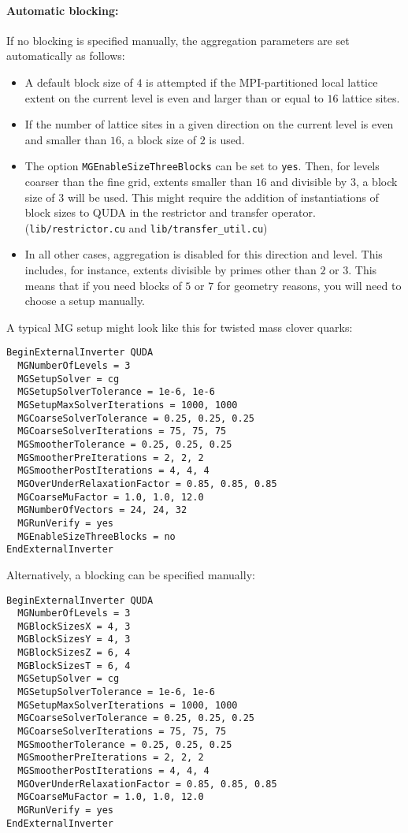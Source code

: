 \paragraph*{Automatic blocking:} If no blocking is specified manually, the aggregation parameters are set automatically as follows:
\begin{itemize}
  \item{ A default block size of $4$ is attempted if the MPI-partitioned local lattice extent on the current level is even and larger than or equal to $16$ lattice sites. }
  \item{ If the number of lattice sites in a given direction on the current level is even and smaller than $16$, a block size of $2$ is used. }
  \item{ The option \texttt{MGEnableSizeThreeBlocks} can be set to \texttt{yes}. Then, for levels coarser than the fine grid, extents smaller than $16$ and divisible by $3$, a block size of $3$ will be used. This might require the addition of instantiations of block sizes to QUDA in the restrictor and transfer operator. (\texttt{lib/restrictor.cu} and \texttt{lib/transfer\_util.cu}) }
  \item{ In all other cases, aggregation is disabled for this direction and level. This includes, for instance, extents divisible by primes other than $2$ or $3$. This means that if you need blocks of $5$ or $7$ for geometry reasons, you will need to choose a setup manually.}
\end{itemize}

A typical MG setup might look like this for twisted mass clover quarks: 

\begin{verbatim}
BeginExternalInverter QUDA
  MGNumberOfLevels = 3
  MGSetupSolver = cg
  MGSetupSolverTolerance = 1e-6, 1e-6
  MGSetupMaxSolverIterations = 1000, 1000
  MGCoarseSolverTolerance = 0.25, 0.25, 0.25
  MGCoarseSolverIterations = 75, 75, 75
  MGSmootherTolerance = 0.25, 0.25, 0.25
  MGSmootherPreIterations = 2, 2, 2
  MGSmootherPostIterations = 4, 4, 4
  MGOverUnderRelaxationFactor = 0.85, 0.85, 0.85
  MGCoarseMuFactor = 1.0, 1.0, 12.0
  MGNumberOfVectors = 24, 24, 32
  MGRunVerify = yes
  MGEnableSizeThreeBlocks = no
EndExternalInverter
\end{verbatim}

Alternatively, a blocking can be specified manually:

\begin{verbatim}
BeginExternalInverter QUDA
  MGNumberOfLevels = 3
  MGBlockSizesX = 4, 3
  MGBlockSizesY = 4, 3
  MGBlockSizesZ = 6, 4
  MGBlockSizesT = 6, 4
  MGSetupSolver = cg
  MGSetupSolverTolerance = 1e-6, 1e-6
  MGSetupMaxSolverIterations = 1000, 1000
  MGCoarseSolverTolerance = 0.25, 0.25, 0.25
  MGCoarseSolverIterations = 75, 75, 75
  MGSmootherTolerance = 0.25, 0.25, 0.25
  MGSmootherPreIterations = 2, 2, 2
  MGSmootherPostIterations = 4, 4, 4
  MGOverUnderRelaxationFactor = 0.85, 0.85, 0.85
  MGCoarseMuFactor = 1.0, 1.0, 12.0
  MGRunVerify = yes
EndExternalInverter
\end{verbatim}

